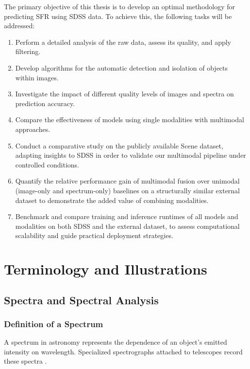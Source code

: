 \documentclass[english,bachelor,oneside]{ctufit-thesis}
\begin{document}
The primary objective of this thesis is to develop an optimal methodology for predicting SFR using SDSS data. To achieve this, the following tasks will be addressed:
\begin{enumerate}
    \item Perform a detailed analysis of the raw data, assess its quality, and apply filtering.
    \item Develop algorithms for the automatic detection and isolation of objects within images.
    \item Investigate the impact of different quality levels of images and spectra on prediction accuracy.
    \item Compare the effectiveness of models using single modalities with multimodal approaches.
    \item Conduct a comparative study on the publicly available Scene dataset, adapting insights to SDSS in order to validate our multimodal pipeline under controlled conditions.
    \item Quantify the relative performance gain of multimodal fusion over unimodal (image-only and spectrum-only) baselines on a structurally similar external dataset to demonstrate the added value of combining modalities.
    \item Benchmark and compare training and inference runtimes of all models and modalities on both SDSS and the external dataset, to assess computational scalability and guide practical deployment strategies.
\end{enumerate}

\section{Terminology and Illustrations}

\subsection{Spectra and Spectral Analysis}

\subsubsection{Definition of a Spectrum}
A spectrum in astronomy represents the dependence of an object's emitted intensity on wavelength. Specialized spectrographs attached to telescopes record these spectra \cite{tennyson2019astronomical}.
\end{document}
